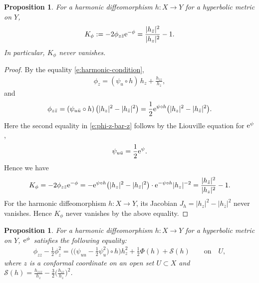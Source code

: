 \documentclass[10pt,a4paper]{amsart}
\numberwithin{equation}{section}
\newtheorem{Proposition}[Theorem]{Proposition}
 { \theoremstyle{definition}
\newtheorem{Remark}[Theorem]{Remark} }
\begin{document}
\begin{Proposition}For a harmonic diffeomorphism $h\colon X\to Y$ for a hyperbolic metric on $Y$,
\begin{gather}\label{e:Gauss-cur}
K_{\phi}:=-2\phi_{z\bar{z}} {\rm e}^{-\phi}= \frac{|h_{\bar{z}}|^2}{|h_z|^2}-1.
\end{gather}
In particular, $K_{\phi}$ never vanishes.
\end{Proposition}

\begin{proof}By the equality \eqref{e:harmonic-condition},
\begin{gather}\label{e:phi-z}
\phi_z= (\psi_u\circ h)\,\displaystyle h_z +\frac{h_{zz}}{h_z},
\end{gather}
and
\begin{gather}\label{e:phi-z-bar-z}
\phi_{z\bar{z}}= (\psi_{u\bar{u}}\circ h)\, \big( |h_z|^2 -|h_{\bar{z}}|^2 \big) = \frac12 {\rm e}^{\psi\circ h} \big( |h_z|^2 -|h_{\bar{z}}|^2 \big).
\end{gather}
Here the second equality in \eqref{e:phi-z-bar-z} follows by the Liouville equation for ${\rm e}^{\psi}$,
\begin{gather}\label{e:liouv}
\psi_{u\bar{u}}=\frac12 {\rm e}^{\psi}.
\end{gather}
Hence we have
\begin{gather*}
K_{\phi}=-2\phi_{z\bar{z}} {\rm e}^{-\phi} = -{\rm e}^{\psi\circ h} \big( |h_z|^2 -|h_{\bar{z}}|^2 \big)\cdot {\rm e}^{-\psi\circ h} |h_z|^{-2} = \frac{|h_{\bar{z}}|^2}{|h_z|^2}-1.
\end{gather*}
For the harmonic diffeomorphism $h\colon X\to Y$, its Jacobian $J_h= |h_z|^2 - |h_{\bar{z}}|^2$ never vanishes. Hence $K_\phi$ never vanishes
by the above equality.
\end{proof}

\begin{Proposition}\label{p:energy-momentum}
For a harmonic diffeomorphism $h\colon X\to Y$ for a hyperbolic metric on $Y$,
 ${\rm e}^\phi$~satisfies the following equality:
\begin{gather*}
\phi_{zz}-\frac12 \phi_z^2 = \bigg(\bigg(\psi_{uu}-\frac12 \psi^2_u \bigg)\circ h\bigg) h_z^2+\frac12 \Phi(h) + \mathcal{S}(h) \qquad \text{on} \quad U,
\end{gather*}
 where $z$ is a conformal coordinate on an open set $U\subset X$ and $\mathcal{S}(h)= \frac{h_{zzz}}{h_z}-\frac 32 \big(\frac{h_{zz}}{h_z}\big)^2$.
\end{Proposition}
\end{document}

